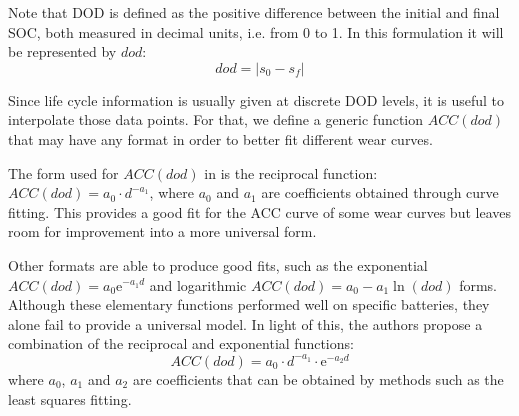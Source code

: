 \documentclass{ieeeaccess}
\begin{document}
    Note that \ac{DOD} is defined as the positive difference between the initial and final \ac{SOC}, both measured in decimal units, i.e. from 0 to 1. In this formulation it will be represented by $dod$:
        $$ dod = |s_{0}-s_{f}|$$

    Since life cycle information is usually given at discrete \ac{DOD} levels, it is useful to interpolate those data points. For that, we define a generic function $ACC(dod)$ that may have any format in order to better fit different wear curves.
    
    The form used for $ACC(dod)$ in \cite{HAN2014} is the reciprocal function: $ACC(dod) = a_{0} \cdot d^{-a_{1}}$, where $a_{0}$ and $a_{1}$ are coefficients obtained through curve fitting. This provides a good fit for the \ac{ACC} curve of some wear curves but leaves room for improvement into a more universal form.
    
    Other formats are able to produce good fits, such as the exponential $ACC(dod) = a_0 \mathrm{e}^{-a_1 d}$ and logarithmic $ACC(dod) = a_0 - a_1 \ln(dod)$ forms. Although these elementary functions performed well on specific batteries, they alone fail to provide a universal model. In light of this, the authors propose a combination of the reciprocal and exponential functions:
    \begin{equation}
    	ACC(dod) = a_0 \cdot d^{-a_1} \cdot \mathrm{e}^{-a_2 d}
    	\label{eq:ACC(dod)}
    \end{equation}
    where $a_0$, $a_1$ and $a_2$ are coefficients that can be obtained by methods such as the least squares fitting.
    
\end{document}
